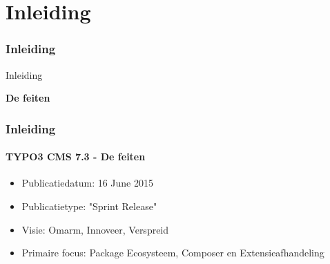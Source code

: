 %

\section{Inleiding}
\begin{frame}[fragile]
	\frametitle{Inleiding}

	\begin{center}\huge{Inleiding}\end{center}
	\begin{center}\huge{\color{typo3darkgrey}\textbf{De feiten}}\end{center}

\end{frame}

\begin{frame}[fragile]
	\frametitle{Inleiding}
	\framesubtitle{TYPO3 CMS 7.3 - De feiten}

	\begin{itemize}
		\item Publicatiedatum: 16 June 2015
		\item Publicatietype: "Sprint Release"
		\item Visie: Omarm, Innoveer, Verspreid
		\item Primaire focus: Package Ecosysteem, Composer en Extensieafhandeling
	\end{itemize}

\end{frame}

